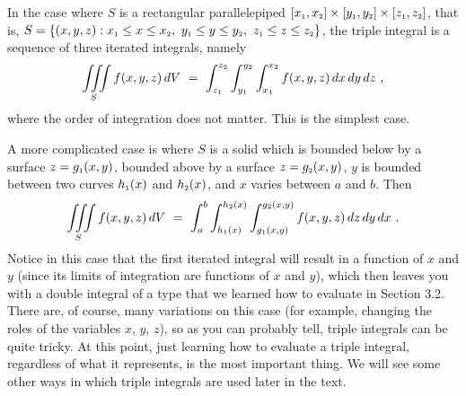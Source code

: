 In the case where $S$ is a rectangular parallelepiped
$\lbrack x_{\scriptscriptstyle 1},x_{\scriptscriptstyle 2} \rbrack \times \lbrack y_{\scriptscriptstyle 1},y_{\scriptscriptstyle 2} \rbrack \times \lbrack
z_{\scriptscriptstyle 1},z_{\scriptscriptstyle 2} \rbrack$, that is, $S = \lbrace (x,y,z): x_{\scriptscriptstyle 1} \le x \le x_{\scriptscriptstyle 2},~
y_{\scriptscriptstyle 1} \le y \le y_{\scriptscriptstyle 2},~z_{\scriptscriptstyle 1} \le z \le z_{\scriptscriptstyle 2} \rbrace$, the triple integral is a sequence
of three iterated integrals, namely
\begin{equation}
 \iiint\limits_{S} f(x,y,z)\,dV ~=~
  \int_{z_{\scriptscriptstyle 1}}^{z_{\scriptscriptstyle 2}} \int_{y_{\scriptscriptstyle 1}}^{y_{\scriptscriptstyle 2}} \int_{x_{\scriptscriptstyle 1}}^{x_{\scriptscriptstyle 2}} f(x,y,z)\,
  dx\,dy\,dz ~,
\end{equation}
where the order of integration does not matter. This is the simplest case.

A more complicated case is where $S$ is a solid which is bounded below by a surface $z=g_{\scriptscriptstyle 1}(x,y)$, bounded above
by a surface $z=g_{\scriptscriptstyle 2}(x,y)$, $y$ is bounded between two curves $h_{\scriptscriptstyle 1}(x)$ and $h_{\scriptscriptstyle 2}(x)$, and $x$
varies between $a$ and $b$. Then
\begin{equation}\label{eqn:vsolid}
 \iiint\limits_{S} f(x,y,z)\,dV ~=~
  \int_{a}^{b} \int_{h_{\scriptscriptstyle 1}(x)}^{h_{\scriptscriptstyle 2}(x)} \int_{g_{\scriptscriptstyle 1}(x,y)}^{g_{\scriptscriptstyle 2}(x,y)} f(x,y,z)\,
  dz\,dy\,dx ~.
\end{equation}
Notice in this case that the first iterated integral will result in a function of $x$ and $y$ (since its limits
of integration are functions of $x$ and $y$), which then leaves you with a double integral of a type that we learned
how to evaluate in Section 3.2. There are, of course, many variations on this case (for example, changing the roles of
the variables $x$, $y$, $z$), so as you can probably tell, triple integrals can be quite tricky. At this point, just
learning how to evaluate a triple integral, regardless of what it represents, is the most important thing. We will see
some other ways in which triple integrals are used later in the text.

